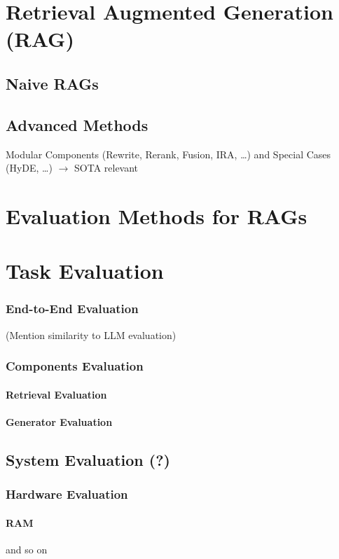 \section{Retrieval Augmented Generation (RAG)}

\subsection{Naive RAGs}

\subsection{Advanced Methods}

Modular Components (Rewrite, Rerank, Fusion, IRA, \dots) and Special Cases (HyDE, \dots) $\longrightarrow$ SOTA relevant


\section{Evaluation Methods for RAGs}

\section{Task Evaluation}

\subsubsection{End-to-End Evaluation}
(Mention similarity to LLM evaluation)

\subsubsection{Components Evaluation}

\paragraph{Retrieval Evaluation}

\paragraph{Generator Evaluation}

\subsection{System Evaluation (?)}

\subsubsection{Hardware Evaluation}

\paragraph{RAM} 

and so on \cdots
